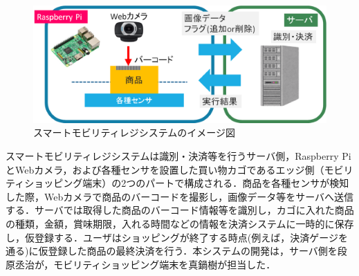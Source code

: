\begin{figure}[htbp]
\centering
\includegraphics[width = 15cm]{./picture/summary2.eps}
\caption{スマートモビリティレジシステムのイメージ図}
\label{summary2}
\end{figure}


スマートモビリティレジシステムは識別・決済等を行うサーバ側，Raspberry PiとWebカメラ，および各種センサを設置した買い物カゴであるエッジ側（モビリティショッピング端末）の2つのパートで構成される．商品を各種センサが検知した際，Webカメラで商品のバーコードを撮影し，画像データ等をサーバへ送信する．サーバでは取得した商品のバーコード情報等を識別し，カゴに入れた商品の種類，金額，賞味期限，入れる時間などの情報を決済システムに一時的に保存し，仮登録する．ユーザはショッピングが終了する時点(例えば，決済ゲージを通る)に仮登録した商品の最終決済を行う．本システムの開発は，サーバ側を段原丞治が，モビリティショッピング端末を真鍋樹が担当した．